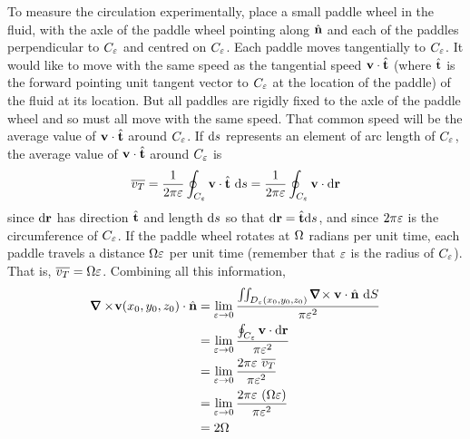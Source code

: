 To measure the circulation 
experimentally, %
place a small paddle wheel in the fluid, with the axle of the paddle wheel
pointing along $\hat{\mathbf{n}}$ and each of the paddles perpendicular to $C_\varepsilon$ 
and  centred on $C_\varepsilon$.%
Each paddle moves tangentially to $C_\varepsilon$. It would like to move with
the same speed as the tangential speed $\mathbf{v}\cdot\hat{\mathbf{t}}$ (where $\hat{\mathbf{t}}$ is the
forward pointing unit tangent vector to $C_\varepsilon$ at the location of the 
paddle) of the fluid at its location. But all paddles are rigidly fixed
to the axle of the paddle wheel and so must all move with the same speed.
That common speed will be the average value of $\mathbf{v}\cdot\hat{\mathbf{t}}$ around $C_\varepsilon$.
If $\mathrm{d}s$ represents an element of arc length of $C_\varepsilon$,  
the average value of $\mathbf{v}\cdot\hat{\mathbf{t}}$ around $C_\varepsilon$ is
\begin{equation*}
\overline{v_T}=\frac{1}{2\pi\varepsilon}\oint_{C_\varepsilon} \mathbf{v}\cdot \hat{\mathbf{t}}\ \mathrm{d}s
=\frac{1}{2\pi\varepsilon}\oint_{C_\varepsilon} \mathbf{v}\cdot \mathrm{d}\mathbf{r}
\end{equation*}
since $\mathrm{d}\mathbf{r}$ has direction $\hat{\mathbf{t}}$ and length $\mathrm{d}s$ 
so that $\mathrm{d}\mathbf{r} =\hat{\mathbf{t}} \mathrm{d}s$, and since $2\pi\varepsilon$ is the circumference of $C_\varepsilon$.
If the paddle wheel rotates at $\Omega$ radians per unit time, each paddle
travels a distance $\Omega\varepsilon$ per unit time
(remember that $\varepsilon$ is the radius of $C_\varepsilon$). That is, $\overline{v_T}=\Omega\varepsilon$. Combining all this information,
\begin{align*}
\vnabla\times\! \vv(x_0,y_0,z_0)\cdot\hn
&=\lim_{\veps\rightarrow 0} 
    \frac{\dblInt_{D_\veps(x_0,y_0,z_0)} \vnabla\!\times \vv\cdot\hn\ \dee{S}}
         {\pi\veps^2} \\
&=\lim_{\veps\rightarrow 0} 
    \frac{\oint_{C_\veps} \vv\cdot \dee{\vr}}
         {\pi\veps^2} \\
&=\lim_{\veps\rightarrow 0} 
    \frac{2\pi\veps\  \overline{v_T}}
         {\pi\veps^2} \\
&=\lim_{\veps\rightarrow 0} 
    \frac{2\pi\veps\  (\Omega \veps)}
         {\pi\veps^2} \\
&=2\Om
\end{align*}
